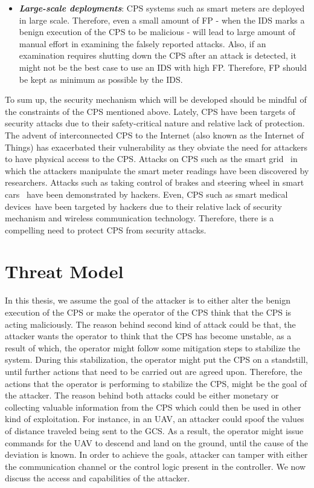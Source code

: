 \begin{itemize}
\item \textbf{\textit{Large-scale deployments}}: \ac{CPS} systems such as smart meters are deployed in large scale. Therefore, even a small amount of \acf{FP} - when the \ac{IDS} marks a benign execution of the \ac{CPS} to be malicious - will lead to large amount of manual effort in examining the falsely reported attacks. Also, if an examination requires shutting down the \ac{CPS} after an attack is detected, it might not be the best case to use an \ac{IDS} with high \ac{FP}. Therefore, \ac{FP} should be kept as minimum as possible by the \ac{IDS}.

\end{itemize}
To sum up, the security mechanism which will be developed should be mindful of the constraints of the \ac{CPS} mentioned above. Lately, \ac{CPS} have been targets of security attacks due to their safety-critical nature and relative lack of protection. The advent of interconnected \ac{CPS} to the Internet (also known as the Internet of Things) has exacerbated their vulnerability as they obviate the need for attackers to have physical access to the \ac{CPS}. Attacks on \ac{CPS} such as the smart grid~\cite{skopik2012survey, liu2012cyber} in which the attackers manipulate the smart meter readings have been discovered by researchers. Attacks such as taking control of brakes and steering wheel in smart cars~\cite{checkoway2011comprehensive, woo2015practical} have been demonstrated by hackers. Even, \ac{CPS} such as smart medical devices~\cite{leavitt2010researchers, radcliffe2011hacking}have been targeted by hackers due to their relative lack of security mechanism and wireless communication technology. Therefore, there is a compelling need to protect \ac{CPS} from security attacks. 


\section{Threat Model}
\label{sec:threatModel}
In this thesis, we assume the goal of the attacker is to either alter the benign execution of the \ac{CPS} or make the operator of the \ac{CPS} think that the \ac{CPS} is acting maliciously. The reason behind second kind of attack could be that, the attacker wants the operator to think that the \ac{CPS} has become unstable, as a result of which, the operator might follow some mitigation steps to stabilize the system. During this stabilization, the operator might put the \ac{CPS} on a standstill, until further actions that need to be carried out are agreed upon. Therefore, the actions that the operator is performing to stabilize the \ac{CPS}, might be the goal of the attacker. The reason behind both attacks could be either monetary or collecting valuable information from the \ac{CPS} which could then be used in other kind of exploitation. For instance, in an \ac{UAV}, an attacker could spoof the values of distance traveled being sent to the \ac{GCS}. As a result, the operator might issue commands for the \ac{UAV} to descend and land on the ground, until the cause of the deviation is known. In order to achieve the goals, attacker can tamper with either the communication channel or the control logic present in the controller. We now discuss the access and capabilities of the attacker.

